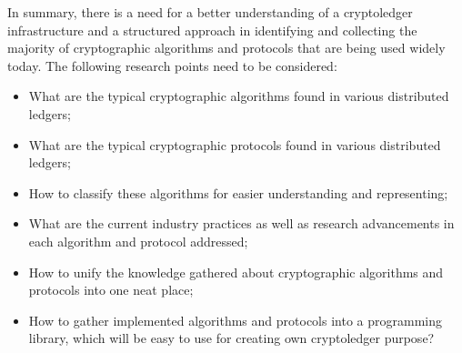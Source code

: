 \documentclass[12pt]{article}
\begin{document}
In summary, there is a need for a better understanding of a
cryptoledger infrastructure and a structured approach in identifying and
collecting the majority of cryptographic algorithms and protocols that are
being used widely today. The following research points
need to be considered:
\begin{itemize}
    \item What are the typical cryptographic algorithms found in various distributed ledgers;
    \item What are the typical cryptographic protocols found in various distributed ledgers;
    \item How to classify these algorithms for easier understanding and representing;
    \item What are the current industry practices as well as research advancements in each algorithm and protocol addressed;
    \item How to unify the knowledge gathered about cryptographic algorithms and protocols into one neat place;
    \item How to gather implemented algorithms and protocols into a programming
          library, which will be easy to use for creating own cryptoledger
          purpose?
\end{itemize}
\end{document}

